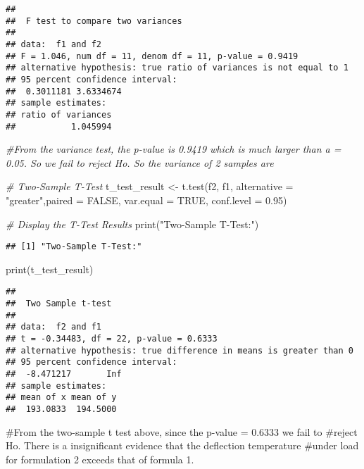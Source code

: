 \documentclass[
]{article}
\newenvironment{Shaded}{\begin{snugshade}}{\end{snugshade}}
\newcommand{\AttributeTok}[1]{\textcolor[rgb]{0.77,0.63,0.00}{#1}}
\newcommand{\CommentTok}[1]{\textcolor[rgb]{0.56,0.35,0.01}{\textit{#1}}}
\newcommand{\ConstantTok}[1]{\textcolor[rgb]{0.00,0.00,0.00}{#1}}
\newcommand{\FloatTok}[1]{\textcolor[rgb]{0.00,0.00,0.81}{#1}}
\newcommand{\FunctionTok}[1]{\textcolor[rgb]{0.00,0.00,0.00}{#1}}
\newcommand{\NormalTok}[1]{#1}
\newcommand{\OtherTok}[1]{\textcolor[rgb]{0.56,0.35,0.01}{#1}}
\newcommand{\StringTok}[1]{\textcolor[rgb]{0.31,0.60,0.02}{#1}}
\begin{document}
\begin{verbatim}
## 
##  F test to compare two variances
## 
## data:  f1 and f2
## F = 1.046, num df = 11, denom df = 11, p-value = 0.9419
## alternative hypothesis: true ratio of variances is not equal to 1
## 95 percent confidence interval:
##  0.3011181 3.6334674
## sample estimates:
## ratio of variances 
##           1.045994
\end{verbatim}

\begin{Shaded}
\begin{Highlighting}[]
\CommentTok{\#From the variance test, the p{-}value is 0.9419 which is much larger than a = 0.05. So we fail to reject Ho. So the variance of 2 samples are }


\CommentTok{\# Two{-}Sample T{-}Test}
\NormalTok{t\_test\_result }\OtherTok{\textless{}{-}} \FunctionTok{t.test}\NormalTok{(f2, f1, }\AttributeTok{alternative =} \StringTok{"greater"}\NormalTok{,}\AttributeTok{paired =} \ConstantTok{FALSE}\NormalTok{,}
                        \AttributeTok{var.equal =} \ConstantTok{TRUE}\NormalTok{, }\AttributeTok{conf.level =} \FloatTok{0.95}\NormalTok{)}

\CommentTok{\# Display the T{-}Test Results}
\FunctionTok{print}\NormalTok{(}\StringTok{"Two{-}Sample T{-}Test:"}\NormalTok{)}
\end{Highlighting}
\end{Shaded}

\begin{verbatim}
## [1] "Two-Sample T-Test:"
\end{verbatim}

\begin{Shaded}
\begin{Highlighting}[]
\FunctionTok{print}\NormalTok{(t\_test\_result)}
\end{Highlighting}
\end{Shaded}

\begin{verbatim}
## 
##  Two Sample t-test
## 
## data:  f2 and f1
## t = -0.34483, df = 22, p-value = 0.6333
## alternative hypothesis: true difference in means is greater than 0
## 95 percent confidence interval:
##  -8.471217       Inf
## sample estimates:
## mean of x mean of y 
##  193.0833  194.5000
\end{verbatim}

\#From the two-sample t test above, since the p-value = 0.6333 we fail
to \#reject Ho. There is a insignificant evidence that the deflection
temperature \#under load for formulation 2 exceeds that of formula 1.
\end{document}
